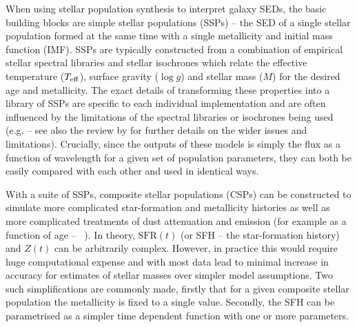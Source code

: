 When using stellar population synthesis to interpret galaxy SEDs, the basic building blocks are simple stellar populations (SSPs) -- the SED of a single stellar population formed at the same time with a single metallicity and initial mass function (IMF). SSPs are typically constructed from a combination of empirical stellar spectral libraries and stellar isochrones which relate the effective temperature ($T_{\rm{eff}}$), surface gravity ($\log g$) and stellar mass ($M$) for the desired age and metallicity. The exact details of transforming these properties into a library of SSPs are specific to each individual implementation and are often influenced by the limitations of the spectral libraries or isochrones being used (e.g. \citet{Leitherer:1999jt, Bruzual:2003ckb, Maraston:2005er} -- see also the review by \citet{Conroy:2013dk} for further details on the wider issues and limitations). Crucially, since the outputs of these models is simply the flux as a function of wavelength for a given set of population parameters, they can both be easily compared with each other and used in identical ways. 

With a suite of SSPs, composite stellar populations (CSPs) can be constructed to simulate more complicated star-formation and metallicity histories as well as more complicated treatments of dust attenuation and emission (for example as a function of age -- \citeauthor{2000ApJ...539..718C}~\citeyear{2000ApJ...539..718C}). In theory, $\text{SFR}(t)$ (or SFH -- the star-formation history) and $Z(t)$ can be arbitrarily complex. However, in practice this would require huge computational expense and with most data lead to minimal increase in accuracy for estimates of stellar masses over simpler model assumptions. Two such simplifications are commonly made, firstly that for a given composite stellar population the metallicity is fixed to a single value. Secondly, the SFH can be parametrised as a simpler time dependent function with one or more parameters.

